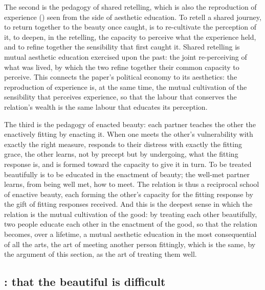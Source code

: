The second is the pedagogy of shared retelling, which is also the reproduction of experience () seen from the side of aesthetic education. To retell a shared journey, to return together to the beauty once caught, is to re-cultivate the perception of it, to deepen, in the retelling, the capacity to perceive what the experience held, and to refine together the sensibility that first caught it. Shared retelling is mutual aesthetic education exercised upon the past: the joint re-perceiving of what was lived, by which the two refine together their common capacity to perceive. This connects the paper's political economy to its aesthetics: the reproduction of experience is, at the same time, the mutual cultivation of the sensibility that perceives experience, so that the labour that conserves the relation's wealth is the same labour that educates its perception.

The third is the pedagogy of enacted beauty: each partner teaches the other the enactively fitting by enacting it. When one meets the other's vulnerability with exactly the right measure, responds to their distress with exactly the fitting grace, the other learns, not by precept but by undergoing, what the fitting response is, and is formed toward the capacity to give it in turn. To be treated beautifully is to be educated in the enactment of beauty; the well-met partner learns, from being well met, how to meet. The relation is thus a reciprocal school of enactive beauty, each forming the other's capacity for the fitting response by the gift of fitting responses received. And this is the deepest sense in which the relation is the mutual cultivation of the good: by treating each other beautifully, two people educate each other in the enactment of the good, so that the relation becomes, over a lifetime, a mutual aesthetic education in the most consequential of all the arts, the art of meeting another person fittingly, which is the same, by the argument of this section, as the art of treating them well.

\subsection{\texorpdfstring{}{Chalepa ta kala}: that the beautiful is difficult}
\label{p21:sub:ae-difficult}

